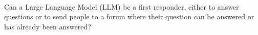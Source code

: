 \documentclass[aspectratio=169]{beamer}
\begin{document}
\begin{frame}{\mbox{ }}
\Large
\vspace{1 cm}

Can a Large Language Model (LLM) be a first responder, either to answer questions or to send people to a forum where their question can be answered or has already been answered?

\vspace{0.5 cm}
\begin{center}
\end{center}
\end{frame}
\end{document}
